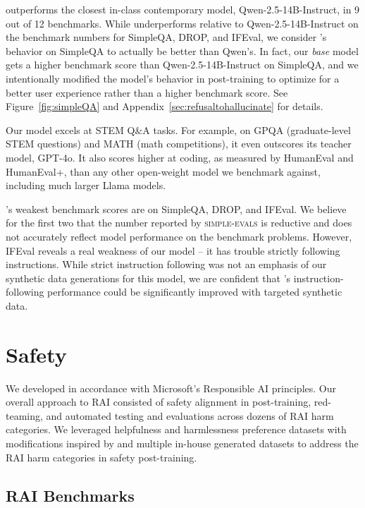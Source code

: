 \model outperforms the closest in-class contemporary model, Qwen-2.5-14B-Instruct, in 9 out of 12 benchmarks.  While \model 
underperforms relative to Qwen-2.5-14B-Instruct on the benchmark numbers for SimpleQA, DROP, and IFEval, we consider \modelwithoutspace's behavior on SimpleQA to actually be better than Qwen's.  In fact, our \emph{base} model gets a higher benchmark score than Qwen-2.5-14B-Instruct on SimpleQA, and we intentionally modified the model's behavior in post-training to optimize for a better user experience rather than a higher benchmark score.  See Figure~\ref{fig:simpleQA} and Appendix~\ref{sec:refusaltohallucinate} for details.

Our model excels at STEM Q\&A tasks.  For example, on GPQA (graduate-level STEM questions) and MATH (math competitions), it even outscores its teacher model, GPT-4o.  It also scores higher at coding, as measured by HumanEval and HumanEval+, than any other open-weight model we benchmark against, including much larger Llama models.

\modelwithoutspace's weakest benchmark scores are on SimpleQA, DROP, and IFEval.
We believe for the first two that the number reported by \textsc{simple-evals} is reductive and does not accurately reflect model performance on the benchmark problems.
However, IFEval reveals a real weakness of our model -- it has trouble strictly following instructions. While strict instruction following was not an emphasis of our synthetic data generations for this model, we are confident that \modelwithoutspace's instruction-following performance could be significantly improved with targeted synthetic data.

\section{Safety}

We developed \model in accordance with Microsoft’s Responsible AI principles. Our overall approach to RAI consisted of safety alignment in post-training, red-teaming, and automated testing and evaluations across dozens of RAI harm categories. We leveraged helpfulness and harmlessness preference datasets \cite{bai2022training, ji2023beavertails} with modifications inspired by \cite{bianchi2024safetytuned} and multiple in-house generated datasets to address the RAI harm categories in safety post-training. 

\subsection{RAI Benchmarks}

